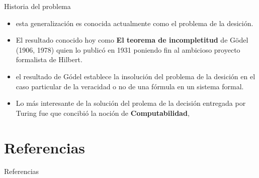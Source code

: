 \documentclass{beamer}
\begin{document}
\begin{frame}{Historia del problema}
    \begin{itemize}
        \item esta generalización es conocida actualmente como el problema de la desición.
        \item El resultado conocido hoy como \textbf{El teorema de incompletitud} de Gödel (1906, 1978) quien lo publicó en 1931 poniendo fin al ambicioso proyecto formalista de Hilbert.\pause
        \item el resultado de Gódel establece la insolución del problema de la desición en el caso particular de la veracidad o no de una fórmula en un sistema formal.\pause
        \item Lo más interesante de la solución del prolema de la decisión entregada por Turing fue que concibió la noción de \textbf{Computabilidad}, \pause
    \end{itemize}
\end{frame}
\section{Referencias}
\begin{frame}{Referencias}
    \begin{thebibliography}{}
    \end{thebibliography}
\end{frame}
\end{document}
